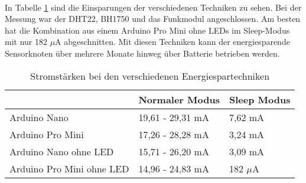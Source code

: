 \paragraph{} In Tabelle \ref{tbl:Energiesparen} sind die Einsparungen der verschiedenen Techniken zu sehen. Bei der Messung war der DHT22, BH1750 und das Funkmodul angeschlossen. Am besten hat die Kombination aus einem Arduino Pro Mini ohne LEDs im Sleep-Modus mit nur 182 $\mu$A  abgeschnitten.  Mit diesen Techniken kann der energiesparende Sensorknoten über mehrere Monate hinweg über Batterie betrieben werden. 
\begin{table}[]
	\centering
	\caption{Stromstärken bei den verschiedenen Energiespartechniken}
	\label{tbl:Energiesparen}
	\begin{tabular}{l|l|l}
		& Normaler Modus   & Sleep Modus \\ \hline
		Arduino Nano              & 19,61 - 29,31 mA & 7,62 mA     \\ \hline
		Arduino Pro Mini          & 17,26 - 28,28 mA & 3,24 mA     \\ \hline
		Arduino Nano ohne LED     & 15,71 - 26,20 mA & 3,09 mA     \\ \hline
		Arduino Pro Mini ohne LED & 14,96 - 24,83 mA & 182 $\mu$A     
	\end{tabular}
\end{table}

